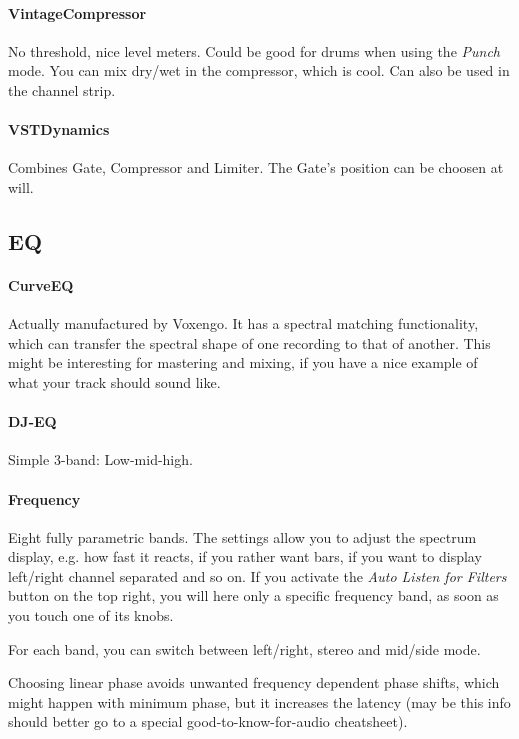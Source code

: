 \documentclass[10pt]{article}
\begin{document}
\paragraph{VintageCompressor} No threshold, nice level meters. Could be good for drums when using the \textit{Punch} mode. You can mix dry/wet in the compressor, which is cool. Can also be used in the channel strip.

\paragraph{VSTDynamics} Combines Gate, Compressor and Limiter. The Gate's position can be choosen at will.

\subsection{EQ}

\paragraph{CurveEQ} Actually manufactured by Voxengo. It has a spectral matching functionality, which can transfer the spectral shape of one recording to that of another. This might be interesting for mastering and mixing, if you have a nice example of what your track should sound like.

\paragraph{DJ-EQ} Simple 3-band: Low-mid-high.

\paragraph{Frequency} Eight fully parametric bands. The settings allow you to adjust the spectrum display, e.g. how fast it reacts, if you rather want bars, if you want to display left/right channel separated and so on. If you activate the \textit{Auto Listen for Filters} button on the top right, you will here only a specific frequency band, as soon as you touch one of its knobs.

For each band, you can switch between left/right, stereo and mid/side mode.

Choosing linear phase avoids unwanted frequency dependent phase shifts, which might happen with minimum phase, but it increases the latency (may be this info should better go to a special good-to-know-for-audio cheatsheet).
\end{document}
